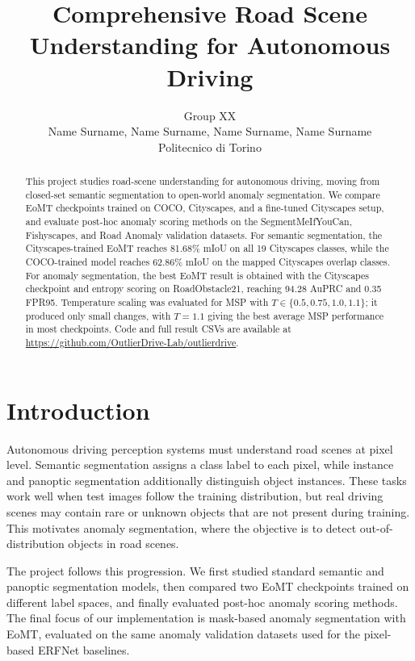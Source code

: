 \title{Comprehensive Road Scene Understanding for Autonomous Driving}

\author{%
Group XX \\
Name Surname, Name Surname, Name Surname, Name Surname \\
Politecnico di Torino
}

\maketitle

\begin{abstract}
This project studies road-scene understanding for autonomous driving, moving from closed-set semantic segmentation to open-world anomaly segmentation. We compare EoMT checkpoints trained on COCO, Cityscapes, and a fine-tuned Cityscapes setup, and evaluate post-hoc anomaly scoring methods on the SegmentMeIfYouCan, Fishyscapes, and Road Anomaly validation datasets. For semantic segmentation, the Cityscapes-trained EoMT reaches 81.68\% mIoU on all 19 Cityscapes classes, while the COCO-trained model reaches 62.86\% mIoU on the mapped Cityscapes overlap classes. For anomaly segmentation, the best EoMT result is obtained with the Cityscapes checkpoint and entropy scoring on RoadObstacle21, reaching 94.28 AuPRC and 0.35 FPR95. Temperature scaling was evaluated for MSP with $T \in \{0.5,0.75,1.0,1.1\}$; it produced only small changes, with $T=1.1$ giving the best average MSP performance in most checkpoints. Code and full result CSVs are available at \url{https://github.com/OutlierDrive-Lab/outlierdrive}.
\end{abstract}

\section{Introduction}
Autonomous driving perception systems must understand road scenes at pixel level. Semantic segmentation assigns a class label to each pixel, while instance and panoptic segmentation additionally distinguish object instances. These tasks work well when test images follow the training distribution, but real driving scenes may contain rare or unknown objects that are not present during training. This motivates anomaly segmentation, where the objective is to detect out-of-distribution objects in road scenes.

The project follows this progression. We first studied standard semantic and panoptic segmentation models, then compared two EoMT checkpoints trained on different label spaces, and finally evaluated post-hoc anomaly scoring methods. The final focus of our implementation is mask-based anomaly segmentation with EoMT, evaluated on the same anomaly validation datasets used for the pixel-based ERFNet baselines.

